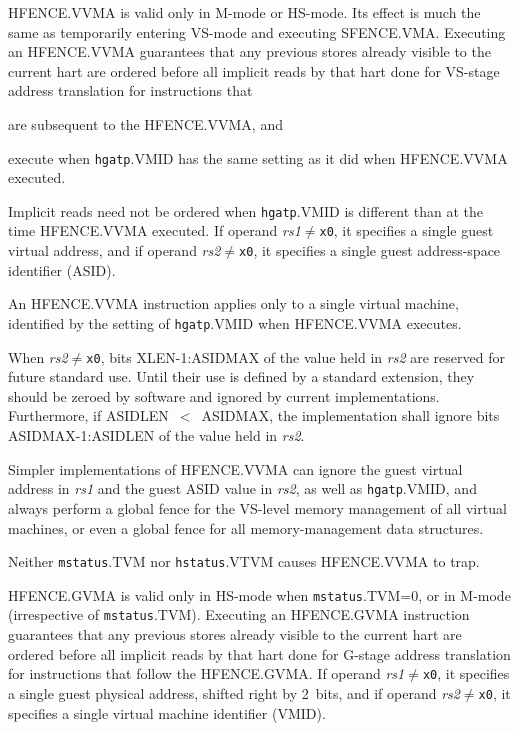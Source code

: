 HFENCE.VVMA is valid only in M-mode or HS-mode.
Its effect is much the
same as temporarily entering VS-mode and executing SFENCE.VMA.
Executing an HFENCE.VVMA guarantees that any previous stores already visible
to the current hart are ordered before all implicit reads by that
hart done for VS-stage address translation for instructions that
\begin{compactitem}
\item
are subsequent to the HFENCE.VVMA, and
\item
execute when {\tt hgatp}.VMID has the same setting as it did when HFENCE.VVMA
executed.
\end{compactitem}
Implicit reads need not be ordered when {\tt hgatp}.VMID is different than at
the time HFENCE.VVMA executed.
If operand {\em rs1}$\neq${\tt x0}, it specifies a single guest virtual
address, and if operand {\em rs2}$\neq${\tt x0}, it specifies a single guest
address-space identifier
(ASID).

\begin{commentary}
An HFENCE.VVMA instruction applies only to a single virtual machine, identified
by the setting of {\tt hgatp}.VMID when HFENCE.VVMA executes.
\end{commentary}

When {\em rs2}$\neq${\tt x0}, bits XLEN-1:ASIDMAX of the value held in {\em
rs2} are reserved for future standard use.  Until their use is defined by a
standard extension, they should be zeroed by software and ignored
by current implementations.
Furthermore, if ASIDLEN~$<$~ASIDMAX, the implementation shall ignore bits
ASIDMAX-1:ASIDLEN of the value held in {\em rs2}.

\begin{commentary}
Simpler implementations of HFENCE.VVMA can ignore the guest virtual address in
{\em rs1} and the guest ASID value in {\em rs2}, as well as {\tt hgatp}.VMID,
and always perform a global fence for the VS-level memory management of all
virtual machines, or even a global fence for all memory-management data
structures.
\end{commentary}

Neither {\tt mstatus}.TVM nor {\tt hstatus}.VTVM causes HFENCE.VVMA to
trap.

HFENCE.GVMA is valid only in HS-mode when {\tt mstatus}.TVM=0, or in
M-mode (irrespective of {\tt mstatus}.TVM).
Executing an HFENCE.GVMA instruction guarantees that any previous stores
already visible to the current hart are ordered before all implicit
reads by that hart done for G-stage address translation for instructions
that follow the HFENCE.GVMA.
If operand {\em rs1}$\neq${\tt x0}, it specifies a single guest physical
address, shifted right by 2~bits, and if operand {\em rs2}$\neq${\tt x0}, it
specifies a single virtual machine identifier (VMID).

